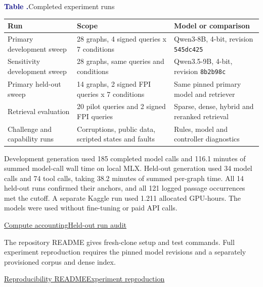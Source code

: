 \documentclass[11pt,a4paper]{article}
\newcommand{\runninglabel}{}
\newcommand{\reportpage}[1]{\newpage\renewcommand{\runninglabel}{#1}}
\newcommand{\tablehead}[1]{\textbf{#1}}
\newcounter{reporttable}
\newenvironment{reporttable}[1]{%
  \par\addvspace{14pt}\noindent\begin{minipage}{\linewidth}
  \refstepcounter{reporttable}%
  {\rmfamily\fontsize{10.5}{13.5}\selectfont
    \textcolor{Navy}{\bfseries Table \thereporttable.}\enspace #1}\par\vspace{8pt}%
  \rmfamily\fontsize{10.2}{13.5}\selectfont
  \renewcommand{\arraystretch}{1.26}%
  \setlength{\tabcolsep}{9pt}%
  \arrayrulecolor{Rule}%
}{%
  \end{minipage}\par\addvspace{13pt}%
}
\newcommand{\evidencelinks}[2]{%
  \par\nopagebreak\vspace{1pt}%
  {\sffamily\fontsize{9.5}{13}\selectfont
   #1\quad\textcolor{Rule}{\textbar}\quad#2\par}%
}
\begin{document}
\begin{reporttable}{Completed experiment runs}
\begin{tabularx}{\linewidth}{@{}L{0.79}L{1.06}L{1.15}@{}}
\toprule
\tablehead{Run} & \tablehead{Scope} & \tablehead{Model or comparison} \\
\midrule
Primary development sweep & 28 graphs, 4 signed queries x 7 conditions & Qwen3-8B, 4-bit, revision \texttt{545dc425} \\
Sensitivity development sweep & 28 graphs, same queries and conditions & Qwen3.5-9B, 4-bit, revision \texttt{8b2b98c} \\
Primary held-out sweep & 14 graphs, 2 signed FPI queries x 7 conditions & Same pinned primary model and retriever \\
Retrieval evaluation & 20 pilot queries and 2 signed FPI queries & Sparse, dense, hybrid and reranked retrieval \\
Challenge and capability runs & Corruptions, public data, scripted states and faults & Rules, model and controller diagnostics \\
\bottomrule
\end{tabularx}
\end{reporttable}

Development generation used 185 completed model calls and 116.1 minutes
of summed model-call wall time on local MLX. Held-out generation used 34
model calls and 74 tool calls, taking 38.2 minutes of summed per-graph
time. All 14 held-out runs confirmed their anchors, and all 121 logged
passage occurrences met the cutoff. A separate Kaggle run used 1.211
allocated GPU-hours. The models were used without fine-tuning or paid
API calls.
\evidencelinks
  {\href{https://github.com/DeeptiKoranga/lma-grounding-decay/blob/b/episode-confirmation/reports/compute_log.md}{Compute accounting}}
  {\href{https://github.com/DeeptiKoranga/lma-grounding-decay/blob/b/episode-confirmation/reports/heldout_generation_20261112.md}{Held-out run audit}}

The repository README gives fresh-clone setup and test commands. Full
experiment reproduction requires the pinned model revisions and a
separately provisioned corpus and dense index.
\evidencelinks
  {\href{https://github.com/DeeptiKoranga/lma-grounding-decay/blob/b/episode-confirmation/README.md}{Reproducibility README}}
  {\href{https://github.com/DeeptiKoranga/lma-grounding-decay/blob/b/episode-confirmation/docs/reproduction.md}{Experiment reproduction}}

\reportpage{Ablations}
\end{document}
